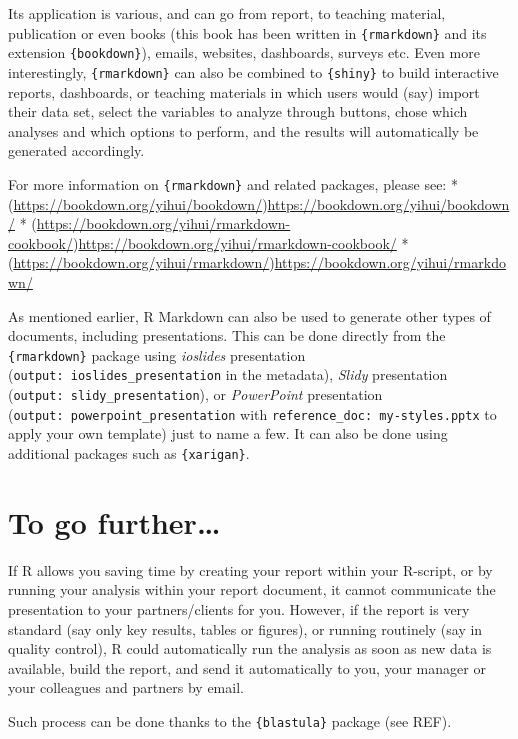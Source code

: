 \documentclass[
]{krantz}
\begin{document}
Its application is various, and can go from report, to teaching material, publication or even books (this book has been written in \texttt{\{rmarkdown\}} and its extension \texttt{\{bookdown\}}), emails, websites, dashboards, surveys etc. Even more interestingly, \texttt{\{rmarkdown\}} can also be combined to \texttt{\{shiny\}} to build interactive reports, dashboards, or teaching materials in which users would (say) import their data set, select the variables to analyze through buttons, chose which analyses and which options to perform, and the results will automatically be generated accordingly.

For more information on \texttt{\{rmarkdown\}} and related packages, please see:
* (\url{https://bookdown.org/yihui/bookdown/})\url{https://bookdown.org/yihui/bookdown/}
* (\url{https://bookdown.org/yihui/rmarkdown-cookbook/})\url{https://bookdown.org/yihui/rmarkdown-cookbook/}
* (\url{https://bookdown.org/yihui/rmarkdown/})\url{https://bookdown.org/yihui/rmarkdown/}

As mentioned earlier, R Markdown can also be used to generate other types of documents, including presentations. This can be done directly from the \texttt{\{rmarkdown\}} package using \emph{ioslides} presentation (\texttt{output:\ ioslides\_presentation} in the metadata), \emph{Slidy} presentation (\texttt{output:\ slidy\_presentation}), or \emph{PowerPoint} presentation (\texttt{output:\ powerpoint\_presentation} with \texttt{reference\_doc:\ my-styles.pptx} to apply your own template) just to name a few. It can also be done using additional packages such as \texttt{\{xarigan\}}.

\hypertarget{to-go-further}{%
\section{To go further\ldots{}}\label{to-go-further}}

If R allows you saving time by creating your report within your R-script, or by running your analysis within your report document, it cannot communicate the presentation to your partners/clients for you. However, if the report is very standard (say only key results, tables or figures), or running routinely (say in quality control), R could automatically run the analysis as soon as new data is available, build the report, and send it automatically to you, your manager or your colleagues and partners by email.

Such process can be done thanks to the \texttt{\{blastula\}} package (see REF).
\end{document}
